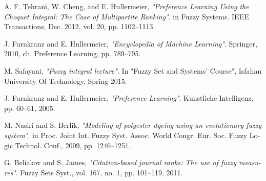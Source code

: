\documentclass[journal]{IEEEtran}
\newcommand{\نیمفاصله}{\halfspace}
\renewcommand{\ }{\halfspace}
\renewcommand{\یا}{یادگیری\ ارجحیت }
\newcommand{\یم}{یادگیری\ ماشین }
\renewcommand{\تر}{تابع رتبه\ بند }
\newcommand{\ار}{ارجحیت }
\renewcommand{\|}[1][.3em]{\hspace{#1}|\hspace{#1}}
\renewcommand{\,}[1][.3em]{,\hspace{#1}}
\begin{document}
\begin{thebibliography}{1}
\begin{latin}\scriptsize

A. F. Tehrani, W. Cheng, and E. Hullermeier, \emph{"Preference Learning Using the Choquet Integral: The Case of Multipartite Ranking"}. in Fuzzy Systems. IEEE Transactions, Dec. 2012, vol. 20, pp. 1102–1113.

J. Furnkranz and E. Hullermeier, \emph{"Encyclopedia of Machine Learning"}. Springer, 2010, ch. Preference Learning, pp. 789–795.

M. Safayani, \emph{"Fuzzy integral lecture"}. In "Fuzzy Set and Systems' Course", Isfahan University Of Technology, Spring 2015.

J. Furnkranz and E. Hullermeier, \emph{"Preference Learning"}. Kunstliche Intelligenz, pp. 60–61, 2005.

M. Nasiri and S. Berlik, \emph{"Modeling of polyester dyeing using an evolutionary fuzzy system"}. in Proc. Joint Int. Fuzzy Syst. Assoc. World Congr. Eur. Soc. Fuzzy Logic Technol. Conf., 2009, pp. 1246–1251.

G. Beliakov and S. James, \emph{"Citation-based journal ranks: The use of fuzzy measures"}. Fuzzy Sets Syst., vol. 167, no. 1, pp. 101–119, 2011.

\end{latin}
\end{thebibliography}
\end{document}

